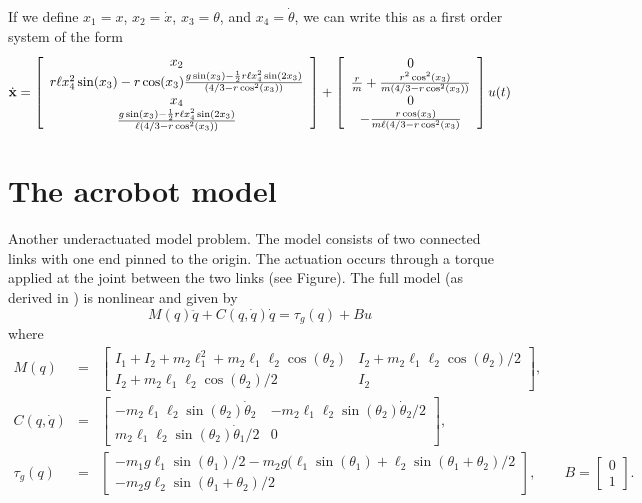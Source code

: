 \documentclass[11pt, oneside]{article}   	%
\begin{document}
If we define $x_1=x$, $x_2=\dot{x}$, $x_3=\theta$, and $x_4=\dot{\theta}$, we can write this as a first order 
system of the form
%
\begin{displaymath}
  \dot{\bf x} = \left[ \begin{array}{c}
        x_2 \\ 
        r\ell x_4^2\sin(x_3) - r\cos(x_3)\frac{g\sin(x_3)-\frac{1}{2}r\ell x_4^2\sin(2x_3)}{(4/3-r\cos^2(x_3))} \\
        x_4 \\
        \frac{g\sin(x_3)-\frac{1}{2}r\ell x_4^2\sin(2x_3)}{\ell(4/3-r\cos^2(x_3))} 
        \end{array} \right] +
        \left[ \begin{array}{c}
        0 \\
        \frac{r}{m}+\frac{r^2\cos^2(x_3)}{m(4/3-r\cos^2(x_3))} \\
        0 \\
        -\frac{r\cos(x_3)}{m\ell(4/3-r\cos^2(x_3)} 
        \end{array} \right] u(t)
\end{displaymath} 
        
\section{The acrobot model}

Another underactuated model problem.  The model consists of two connected links with one end pinned to the
origin.  The actuation occurs through a torque applied at the joint between the two links (see Figure).  The
full model (as derived in \cite{tedrake2023underactuated}) is nonlinear and given by
%
\begin{displaymath}
  M(q)\ddot{q} + C(q,\dot{q})\dot{q} = \tau_g(q) + Bu
\end{displaymath}
%
where
%
\begin{eqnarray*}
  M(q) &=& \left[ \begin{array}{cc} I_1 + I_2 + m_2 \ell_1^2 + m_2\ell_1\ell_2\cos(\theta_2) & I_2+m_2\ell_1\ell_2\cos(\theta_2)/2 \\
  I_2+m_2\ell_1\ell_2\cos(\theta_2)/2 & I_2 \end{array} \right],\\
  C(q,\dot{q}) &=& \left[ \begin{array}{cc} -m_2\ell_1\ell_2\sin(\theta_2)\dot{\theta}_2 & -m_2\ell_1\ell_2\sin(\theta_2)\dot{\theta}_2/2 \\
  m_2\ell_1\ell_2\sin(\theta_2)\dot{\theta}_1/2 & 0 \end{array} \right], \\
  \tau_g(q) &=& \left[ \begin{array}{c} -m_1g\ell_1\sin(\theta_1)/2 - m_2 g(\ell_1\sin(\theta_1)+\ell_2\sin(\theta_1+\theta_2)/2 \\ -m_2g\ell_2\sin(\theta_1+\theta_2)/2 \end{array} \right],
  \qquad B = \left[ \begin{array}{c} 0 \\ 1 \end{array} \right].
\end{eqnarray*}



\end{document}
